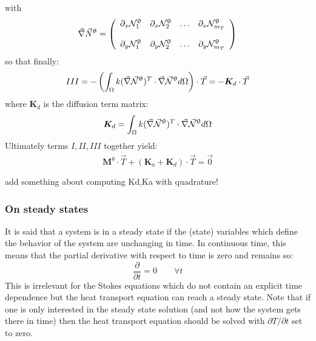 with 
\[
\vec \nabla \vec N^\uptheta = 
\left(
\begin{array}{cccc}
\partial_x {\mathcal{N}}_1^\uptheta & 
\partial_x {\mathcal{N}}_2^\uptheta & \dots &
\partial_x {\mathcal{N}}_{m_T}^\uptheta \\ \\
\partial_y {\mathcal{N}}_1^\uptheta & 
\partial_y {\mathcal{N}}_2^\uptheta & \dots &
\partial_y {\mathcal{N}}_{m_T}^\uptheta 
\end{array}
\right)
\]
so that finally:
\[
III = - \left( \int_\Omega k (\vec \nabla \vec {{\mathcal{N}}}^\uptheta)^T \cdot 
\vec \nabla \vec {{\mathcal{N}}}^\uptheta d\Omega \right) \cdot \vec T
= - {\bm K}_d \cdot \vec T
\]
where ${\bm K}_d$ is the diffusion term matrix:
\[
{\bm K}_d = \int_\Omega  k (\vec \nabla \vec {{\mathcal{N}}}^\uptheta)^T \cdot \vec \nabla \vec {{\mathcal{N}}}^\uptheta d\Omega 
\]
 Ultimately terms $I,II,III$ together yield:
\[
\boxed{
{\bm M}^\uptheta \cdot \dot{\vec T} + ({\bm K}_a + {\bm K}_d) \cdot \vec T = \vec 0
}
\]


{\color{red} add something about computing Kd,Ka with quadrature!}


\subsubsection{On steady states}

It is said that a system is in a steady state if the (state) variables which define the behavior of the system 
are unchanging in time. In continuous time, this means that the partial derivative with respect to time is zero and remains so:
\[
\frac{\partial}{\partial t} =0 \qquad \forall t
\]
This is irrelevant for the Stokes equations which do not contain an explicit time dependence but the heat 
transport equation can reach a steady state. 
Note that if one is only interested in the steady state solution (and not how the system gets there in time)
then the heat transport equation should be solved with $\partial T/\partial t$ set to zero. 




